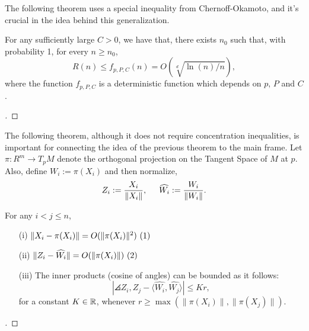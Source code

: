 The following theorem uses a special inequality from Chernoff-Okamoto, and it's crucial in the idea behind this generalization.

\begin{theorem}\label{ade:T2}
  For any sufficiently large $C > 0$, we have that, there exists $n_0$ such that, with probability 1, for every $n \geq n_0$,
  \begin{equation}\label{ade:3}
    R(n) \leq f_{p,P,C}(n) = O(\sqrt[d]{\ln(n)/n}),
  \end{equation}
  where the function $f_{p,P,C}$ is a deterministic function which depends on $p,\, P$ and $C$.
\end{theorem}

\begin{proof}[]

\end{proof}

\vspace*{0.5 em}

The following theorem, although it does not require concentration inequalities, is important for connecting the idea of the previous theorem to the main frame. Let $\pi : R^m \to T_p M$ denote the orthogonal projection on the Tangent Space of $M$ at $p$. Also, define $W_i := \pi(X_i)$ and then normalize,
\begin{equation}\label{ade:4}
  Z_i := \frac{X_i}{\|X_i\|},\hspace*{5mm} \widehat{W_i} := \frac{W_i}{\|W_i\|}.
\end{equation}

\begin{theorem}\label{ade:T3}
  For any $i<j \leq n$,
  \begin{enumerate}
    \item[(i)]    \( \|X_i-\pi(X_i)\|  =   O(\|\pi (X_i)\|^2) \hfill\inlinetag  \)
    \item[(ii)]   \( \|Z_i-\widehat{W_i}\|  =   O(\|\pi (X_i) \|) \hfill\inlinetag \)
    \item[(iii)]  The inner products (cosine of angles) can be bounded as it follows:
    \begin{equation}\label{ade:7}
      |\angles{Z_i,Z_j} - \langle\widehat{W_i}, \widehat{W_j}\rangle| \leq K r,
    \end{equation}
    for a constant $K\in\mathbb{R}$, whenever $r \geq \max (\|\pi(X_i)\|,\|\pi(X_j)\|)$.
  \end{enumerate}
\end{theorem}
\begin{proof}[]

\end{proof}

